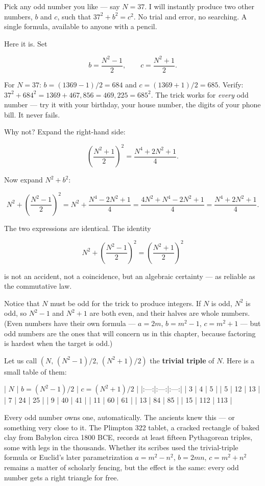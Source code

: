\documentclass[11pt,twoside,openright]{book}
\theoremstyle{definition}
\theoremstyle{remark}
\begin{document}
Pick any odd number you like --- say $N = 37$. I will instantly produce two other numbers, $b$ and $c$, such that $37^2 + b^2 = c^2$. No trial and error, no searching. A single formula, available to anyone with a pencil.

Here it is. Set

\[b = \frac{N^2 - 1}{2}, \qquad c = \frac{N^2 + 1}{2}.\]

For $N = 37$: $b = (1369 - 1)/2 = 684$ and $c = (1369 + 1)/2 = 685$. Verify: $37^2 + 684^2 = 1369 + 467{,}856 = 469{,}225 = 685^2$. The trick works for \textit{every} odd number --- try it with your birthday, your house number, the digits of your phone bill. It never fails.

Why not? Expand the right-hand side:

\[\left(\frac{N^2 + 1}{2}\right)^{\!2} = \frac{N^4 + 2N^2 + 1}{4}.\]

Now expand $N^2 + b^2$:

\[N^2 + \left(\frac{N^2 - 1}{2}\right)^{\!2} = N^2 + \frac{N^4 - 2N^2 + 1}{4} = \frac{4N^2 + N^4 - 2N^2 + 1}{4} = \frac{N^4 + 2N^2 + 1}{4}.\]

The two expressions are identical. The identity

\[N^2 + \left(\frac{N^2 - 1}{2}\right)^{\!2} = \left(\frac{N^2 + 1}{2}\right)^{\!2}\]

is not an accident, not a coincidence, but an algebraic certainty --- as reliable as the commutative law.

Notice that $N$ must be odd for the trick to produce integers. If $N$ is odd, $N^2$ is odd, so $N^2 - 1$ and $N^2 + 1$ are both even, and their halves are whole numbers. (Even numbers have their own formula --- $a = 2m$, $b = m^2 - 1$, $c = m^2 + 1$ --- but odd numbers are the ones that will concern us in this chapter, because factoring is hardest when the target is odd.)

Let us call $(N,\, (N^2-1)/2,\, (N^2+1)/2)$ the \textbf{trivial triple} of $N$. Here is a small table of them:

| $N$ | $b = (N^2-1)/2$ | $c = (N^2+1)/2$ |
|:---:|:---:|:---:|
| 3 | 4 | 5 |
| 5 | 12 | 13 |
| 7 | 24 | 25 |
| 9 | 40 | 41 |
| 11 | 60 | 61 |
| 13 | 84 | 85 |
| 15 | 112 | 113 |

Every odd number owns one, automatically. The ancients knew this --- or something very close to it. The Plimpton 322 tablet, a cracked rectangle of baked clay from Babylon circa 1800 BCE, records at least fifteen Pythagorean triples, some with legs in the thousands. Whether its scribes used the trivial-triple formula or Euclid's later parametrization $a = m^2 - n^2$, $b = 2mn$, $c = m^2 + n^2$ remains a matter of scholarly fencing, but the effect is the same: every odd number gets a right triangle for free.
\end{document}
